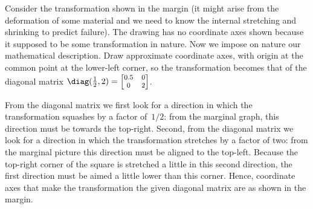 \begin{example} \label{eg:}
Consider the transformation shown in the margin (it might arise from the deformation of some material and we need to know the internal stretching and shrinking to predict failure).
%
The drawing has no coordinate axes shown because it supposed to be some transformation in nature. 
Now we impose on nature our mathematical description.
Draw approximate coordinate axes, with origin at the common point at the lower-left corner, so the transformation becomes that of the diagonal matrix \(\diag(\frac12,2)=\footnotesize\begin{bmatrix} 0.5&0\\0&2 \end{bmatrix}\).

\begin{solution} 
From the diagonal matrix we first look for a direction in which the transformation squashes by a factor of~\(1/2\): from the marginal graph, this direction must be towards the top-right.
%
Second, from the diagonal matrix we look for a direction in which the transformation stretches by a factor of two: from the marginal picture this direction must be aligned to the top-left.
Because the top-right corner of the square is stretched a little in this second direction, the first direction must be aimed a little lower than this corner.
Hence, coordinate axes that make the transformation the given diagonal matrix are as shown in the margin. 
\end{solution}
\end{example}


